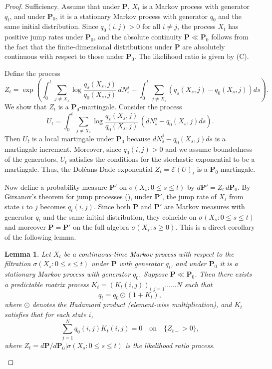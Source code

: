 \documentclass{lms}
\newtheorem{lemma}[theorem]{Lemma}     %
\begin{document}
\begin{proof} {Sufficiency.} Assume that under \(\mathbf{P}\), \(X_t\) is a Markov process with generator \(q_t\), and under \(\mathbf{P}_0\), it is a stationary Markov process with generator \(q_0\) and the same initial distribution. Since \(q_0(i,j) > 0\) for all \(i \neq j\), the process \(X_t\) has positive jump rates under \(\mathbf{P}_0\), and the absolute continuity \(\mathbf{P} \ll \mathbf{P}_0\) follows from the fact that the finite-dimensional distributions under \(\mathbf{P}\) are absolutely continuous with respect to those under \(\mathbf{P}_0\). The likelihood ratio is given by (C).

Define the process
\[
Z_t = \exp\left( \int_0^t \sum_{j \neq X_s} \log \frac{q_s(X_s, j)}{q_0(X_s, j)} \, dN_s^j - \int_0^t \sum_{j \neq X_s} \left( q_s(X_s, j) - q_0(X_s, j) \right) ds \right).
\]
We show that \(Z_t\) is a \(\mathbf{P}_0\)-martingale. Consider the process
\[
U_t = \int_0^t \sum_{j \neq X_s} \log \frac{q_s(X_s, j)}{q_0(X_s, j)} \, (dN_s^j - q_0(X_s, j) ds).
\]
Then \(U_t\) is a local martingale under \(\mathbf{P}_0\) because \(dN_s^j - q_0(X_s, j) ds\) is a martingale increment. Moreover, since \(q_0(i,j) > 0\) and we assume boundedness of the generators, \(U_t\) satisfies the conditions for the stochastic exponential to be a martingale. Thus, the Dol\'eans-Dade exponential \(Z_t = \mathcal{E}(U)_t\) is a \(\mathbf{P}_0\)-martingale.

Now define a probability measure \(\mathbf{P}'\) on $\sigma(X_s:0 \le s \le t)$ by \(d\mathbf{P}' = Z_t \, d\mathbf{P}_0\). By Girsanov's theorem for jump processes (\cite{Sokol03092015}), under \(\mathbf{P}'\), the jump rate of \(X_t\) from state \(i\) to \(j\) becomes \(q_t(i,j)\). Since both \(\mathbf{P}\) and \(\mathbf{P}'\) are Markov measures with generator \(q_t\) and the same initial distribution, they coincide on $\sigma(X_s:0 \le s \le t)$ and moreover \(\mathbf{P} = \mathbf{P}'\) on the full algebra $\sigma(X_s: s\ge 0)$. This is a direct corollary of the following lemma.

\begin{lemma}\label{lem:continuous-generator-vector}
Let \(X_t\) be a continuous-time Markov process with respect to the filtration \(\sigma(X_s:0 \le s \le t)\) under \(\mathbf{P}\) with generator \(q_t\), and under \(\mathbf{P}_0\) it is a stationary Markov process with generator \(q_0\). Suppose \(\mathbf{P} \ll \mathbf{P}_0\). Then there exists a predictable matrix process \(K_t = (K_t(i,j))_{i,j =1}……N\) such that
\[
q_t = q_0 \odot (1 + K_t),
\]
where \(\odot\) denotes the Hadamard product (element-wise multiplication), and \(K_t\) satisfies that for each state \(i\),
\[
\sum_{j=1}^N q_0(i,j) K_t(i,j) = 0 \quad \text{on} \quad \{Z_{t-} > 0\},
\]
where \(Z_t = \left. {d\mathbf{P}}/{d\mathbf{P}_0} \right|{\sigma(X_s:0 \le s \le t)}\) is the likelihood ratio process.
\end{lemma}


\end{proof}
\end{document}
